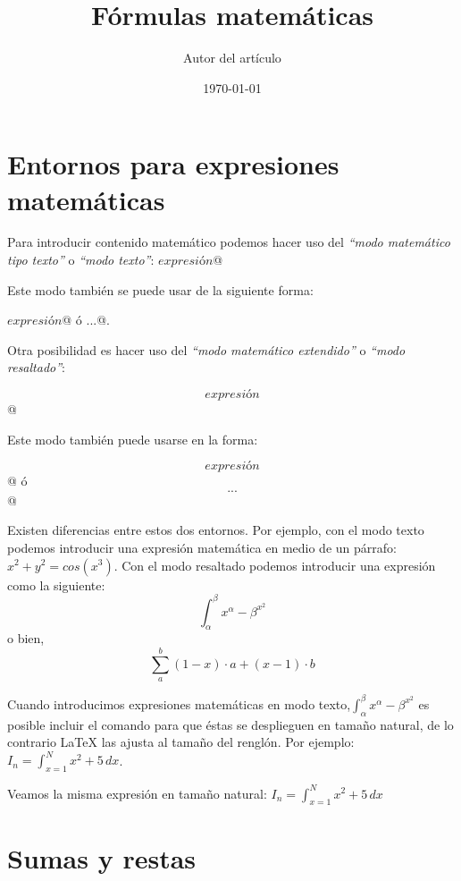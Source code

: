 \documentclass[letterpaper,12pt]{article}
\title{Fórmulas matemáticas}
\author{Autor del artículo}
\date{\today{}}
\begin{document}
\maketitle

\tableofcontents

\section{Entornos para expresiones matemáticas}

Para introducir contenido matemático podemos hacer uso del \textit{``modo matemático tipo texto''} o \textit{``modo texto''}:
\verb@$ expresión $@ 

Este modo también se puede usar de la siguiente forma:

\verb@\( expresión \)@ ó \verb@\begin{math}...\end{math}@.

Otra posibilidad es hacer uso del \textit{``modo matemático extendido''} o \textit{``modo resaltado''}:

\verb@$$ expresión $$@

Este modo también puede usarse en la forma:

 \verb@\[ expresión \]@ ó \verb@\begin{displaymath} ... \end{displaymath}@

Existen diferencias entre estos dos entornos. Por ejemplo, con el modo texto podemos introducir una expresión matemática en medio de un párrafo: $x^2 + y^2 = cos(x^3)$.
Con el modo resaltado podemos introducir una expresión como la siguiente: $$ \int_{\alpha}^{\beta} x^{\alpha} - {\beta}^{x^2} $$ o bien, \[ \sum_{a}^{b} (1-x)\cdot a + (x-1)\cdot b \]

Cuando introducimos expresiones matemáticas en modo texto,$ \int_{\alpha}^{\beta} x^{\alpha} - {\beta}^{x^2} $	 es posible incluir el comando \verb@\displaystyle@ para que éstas se desplieguen en 
tamaño natural, de lo contrario \LaTeX{} las ajusta al tamaño del renglón. Por ejemplo: $ I_n=\int_{x=1}^{N} x^2 + 5 \, dx  $. 

Veamos la misma expresión en tamaño natural: $\displaystyle I_n=\int_{x=1}^{N} x^2 + 5 \, dx  $

\section{Sumas y restas}
\end{document}
